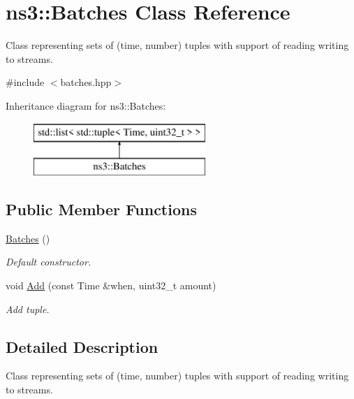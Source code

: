 \hypertarget{classns3_1_1Batches}{}\section{ns3\+:\+:Batches Class Reference}
\label{classns3_1_1Batches}


Class representing sets of (time, number) tuples with support of reading writing to streams.  




{\ttfamily \#include $<$batches.\+hpp$>$}

Inheritance diagram for ns3\+:\+:Batches\+:\begin{figure}[H]
\begin{center}
\leavevmode
\includegraphics[height=2.000000cm]{classns3_1_1Batches}
\end{center}
\end{figure}
\subsection*{Public Member Functions}
\begin{DoxyCompactItemize}
\item 
\hyperlink{classns3_1_1Batches_a043a2e2bd4c385f698e2b13afba01340}{Batches} ()\hypertarget{classns3_1_1Batches_a043a2e2bd4c385f698e2b13afba01340}{}\label{classns3_1_1Batches_a043a2e2bd4c385f698e2b13afba01340}

\begin{DoxyCompactList}\small\item\em Default constructor. \end{DoxyCompactList}\item 
void \hyperlink{classns3_1_1Batches_af31ef0e7050b4880133a92f3a77790bc}{Add} (const Time \&when, uint32\+\_\+t amount)
\begin{DoxyCompactList}\small\item\em Add tuple. \end{DoxyCompactList}\end{DoxyCompactItemize}


\subsection{Detailed Description}
Class representing sets of (time, number) tuples with support of reading writing to streams. 

